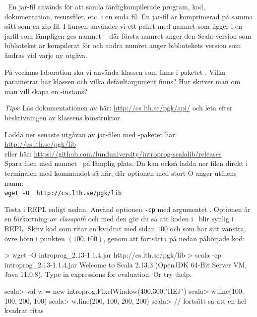 \QUESTEND




\QUESTBEGIN

\Task \what~En jar-fil används för att samla färdigkompilerade program, kod, dokumentation, resursfiler, etc, i en enda fil. En jar-fil är komprimerad på samma sätt som en zip-fil. I kursen använder vi ett paket med namnet  som ligger i en jarfil som lämpligen ges namnet \LibJar~ där första numret anger den Scala-version som biblioteket är kompilerat för och andra numret anger bibliotekets version som ändras vid varje ny utgåva.

\Subtask På veckans laboration ska vi använda klassen  som finns i paketet . Vilka parametrar har klassen  och vilka defaultargument finns? Hur skriver man om man vill skapa en -instans?

\emph{Tips:}  Läs dokumentationen av  här: \url{http://cs.lth.se/pgk/api/}
och leta efter beskrivningen av klassens konstruktor.

\Subtask Ladda ner senaste utgåvan av jar-filen med -paketet här:
\\\url{http://cs.lth.se/pgk/lib}\\eller här: \url{https://github.com/lunduniversity/introprog-scalalib/releases}
\\ Spara filen med namnet  \LibJar~på lämplig plats. Du kan också ladda ner filen direkt i terminalen med kommandot  så här, där optionen  med stort O anger utfilens namn:\\
\texttt{wget -O \LibJar~http://cs.lth.se/pgk/lib}

\Subtask Testa  i REPL enligt nedan. Använd optionen \texttt{-cp} med argumentet \LibJar. Optionen  är en förkortning av \emph{classpath} och med den gör du så att koden i \LibJar~blir synlig i REPL.  Skriv kod som ritar en kvadrat med sidan $100$ och som har sitt vänstra, övre hörn i punkten $(100,100)$, genom att fortsätta på nedan påbörjade kod:

\begin{REPL}
> wget -O introprog_2.13-1.1.4.jar http://cs.lth.se/pgk/lib
> scala -cp introprog_2.13-1.1.4.jar
Welcome to Scala 2.13.3 (OpenJDK 64-Bit Server VM, Java 11.0.8).
Type in expressions for evaluation. Or try :help.

scala> val w = new introprog.PixelWindow(400,300,"HEJ")
scala> w.line(100, 100, 200, 100)
scala> w.line(200, 100, 200, 200)
scala> // fortsätt så att en hel kvadrat ritas
\end{REPL}

